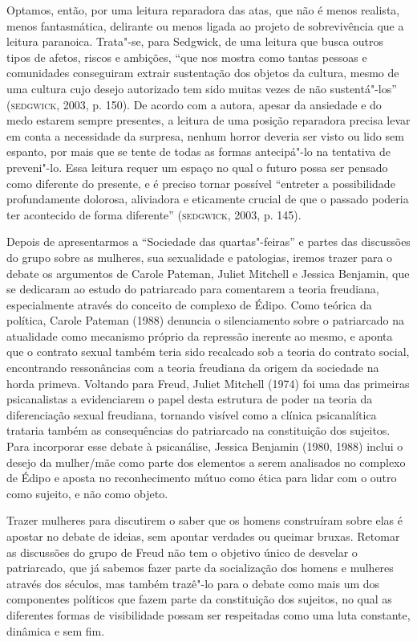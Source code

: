 Optamos, então, por uma leitura reparadora das atas, que não é menos
realista, menos fantasmática, delirante ou menos ligada ao projeto de
sobrevivência que a leitura paranoica. Trata"-se, para Sedgwick, de uma
leitura que busca outros tipos de afetos, riscos e ambições, ``que nos
mostra como tantas pessoas e comunidades conseguiram extrair sustentação
dos objetos da cultura, mesmo de uma cultura cujo desejo autorizado tem
sido muitas vezes de não sustentá"-los'' (\textsc{sedgwick}, 2003, p. 150). De
acordo com a autora, apesar da ansiedade e do medo estarem sempre
presentes, a leitura de uma posição reparadora precisa levar em conta a
necessidade da surpresa, nenhum horror deveria ser visto ou lido sem
espanto, por mais que se tente de todas as formas antecipá"-lo na
tentativa de preveni"-lo. Essa leitura requer um espaço no qual o futuro
possa ser pensado como diferente do presente, e é preciso tornar
possível ``entreter a possibilidade profundamente dolorosa, aliviadora e
eticamente crucial de que o passado poderia ter acontecido de forma
diferente'' (\textsc{sedgwick}, 2003, p. 145).

Depois de apresentarmos a ``Sociedade das quartas"-feiras'' e partes das
discussões do grupo sobre as mulheres, sua sexualidade e patologias,
iremos trazer para o debate os argumentos de Carole Pateman,
Juliet Mitchell e Jessica Benjamin, que se dedicaram
ao estudo do patriarcado para comentarem a teoria freudiana,
especialmente através do conceito de complexo de Édipo. Como teórica da
política, Carole Pateman (1988) denuncia o silenciamento sobre o
patriarcado na atualidade como mecanismo próprio da repressão inerente
ao mesmo, e aponta que o contrato sexual também teria sido recalcado sob
a teoria do contrato social, encontrando ressonâncias com a teoria
freudiana da origem da sociedade na horda primeva. Voltando para Freud,
Juliet Mitchell (1974) foi uma das primeiras psicanalistas a
evidenciarem o papel desta estrutura de poder na teoria da diferenciação
sexual freudiana, tornando visível como a clínica psicanalítica trataria
também as consequências do patriarcado na constituição dos sujeitos.
Para incorporar esse debate à psicanálise, Jessica Benjamin (1980, 1988)
inclui o desejo da mulher/mãe como parte dos elementos a serem
analisados no complexo de Édipo e aposta no reconhecimento mútuo como
ética para lidar com o outro como sujeito, e não como objeto.

Trazer mulheres para discutirem o saber que os homens construíram sobre
elas é apostar no debate de ideias, sem apontar verdades ou queimar
bruxas. Retomar as discussões do grupo de Freud não tem o objetivo único
de desvelar o patriarcado, que já sabemos fazer parte da socialização
dos homens e mulheres através dos séculos, mas também trazê"-lo para o
debate como mais um dos componentes políticos que fazem parte da
constituição dos sujeitos, no qual as diferentes formas de visibilidade
possam ser respeitadas como uma luta constante, dinâmica e sem fim.

